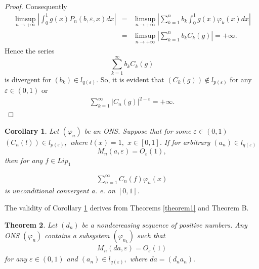 \documentclass{publmathdeb}
\newtheorem{theorem}{Theorem}[section]
\newtheorem{corollary}[theorem]{Corollary}
\begin{document}
\begin{proof}
		Consequently
		\begin{eqnarray*}
			\limsup_{n \rightarrow +\infty}\left|\int_{0}^{1} g(x)  P_n(b, \varepsilon,x)dx\right| 
			&=&	\limsup_{n \rightarrow +\infty}\left|\sum_{k=1}^{n} b_k \int_{0}^{1} g(x)  \varphi_{k}(x)dx\right| \\ 
			&=& \limsup_{n \rightarrow +\infty}\left|\sum_{k=1}^{n} b_k C_k(g)\right| =+ \infty.
		\end{eqnarray*}
		Hence the series 
		$$\sum_{k=1}^{\infty} b_k C_k(g)$$
		is divergent for $(b_k)\in l_{q(\varepsilon)} .$ So, it is evident that  $(C_k (g))\notin l_{p(\varepsilon)}$ for any $\varepsilon \in (0,1)$ or
		\begin{eqnarray*}
			\sum_{k=1}^{\infty} \left|C_n(g)\right|^{2-\varepsilon} =+\infty.
		\end{eqnarray*}
		
	\end{proof}
	\begin{corollary}
		\label{cor1} Let $(\varphi_n)$ be an ONS. Suppose that for some $\varepsilon \in (0,1)$  $(C_n (l)) \in l_{p(\varepsilon)},$ where $l(x)=1,$ $x \in [0,1].$ If for arbitrary $(a_n) \in l_{q(\varepsilon)}$ 
		\begin{equation*}
			M_n(a, \varepsilon) = O_{\varepsilon}(1),
		\end{equation*}
		then for any $f\in Lip_1$
		
		\begin{eqnarray*}
			\sum_{n=1}^{\infty} C_n(f) \varphi_{n}(x)
		\end{eqnarray*}
		is unconditional convergent a. e. on $[0,1].$
	\end{corollary}
	
	The validity of Corollary \ref{cor1} derives from Theorems \ref{theorem1} and Theorem {B}.
	\begin{theorem}\label{theorem4}
		Let $(d_n)$ be a nondecreasing sequence of positive numbers. Any ONS $(\varphi_{n})$ contains a subsystem $(\varphi_{n_{k}})$ such that 
		\begin{eqnarray}
			\label{eq22} M_n(d a,\varepsilon)=O_{\varepsilon}(1)
		\end{eqnarray}
		for any $\varepsilon \in (0,1)$  and $(a_n) \in l_{q(\varepsilon)},$ where $da=(d_n  a_n).$
	\end{theorem}
	
\end{document}
